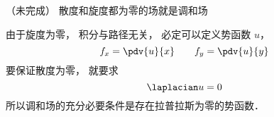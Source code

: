 
（未完成）
散度和旋度都为零的场就是调和场

由于旋度为零， 积分与路径无关， 必定可以定义势函数 $u$， 
\begin{equation}
f_x = \pdv{u}{x} \qquad f_y = \pdv{u}{y}
\end{equation}
要保证散度为零， 就要求
\begin{equation}
\laplacian u = 0
\end{equation}
所以调和场的充分必要条件是存在拉普拉斯为零的势函数．
